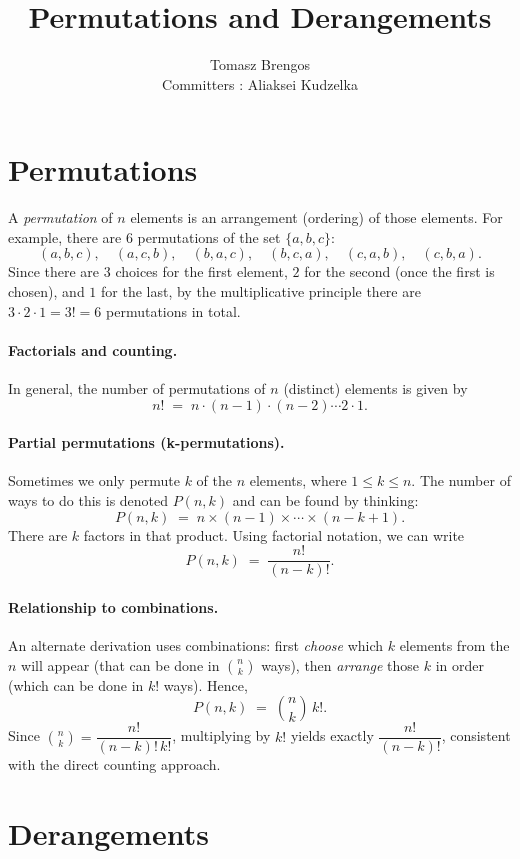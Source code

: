 \documentclass[docmute]{article}
\title{Permutations and Derangements}
\author{Tomasz Brengos \\  
Committers : Aliaksei Kudzelka}
\date{}
\begin{document}
\maketitle

\section{Permutations}
A \emph{permutation} of $n$ elements is an arrangement (ordering) of those elements.
For example, there are $6$ permutations of the set $\{a,b,c\}$:
\[
(a,b,c), \quad (a,c,b), \quad (b,a,c), \quad (b,c,a), \quad (c,a,b), \quad (c,b,a).
\]
Since there are $3$ choices for the first element, $2$ for the second (once the first is chosen), and $1$ for the last, by the multiplicative principle there are $3 \cdot 2 \cdot 1 = 3! = 6$ permutations in total.

\paragraph{Factorials and counting.}
In general, the number of permutations of $n$ (distinct) elements is given by
\[
n! \;=\; n \cdot (n-1) \cdot (n-2) \cdots 2 \cdot 1.
\]


\paragraph{Partial permutations (k-permutations).}
Sometimes we only permute $k$ of the $n$ elements, where $1 \le k \le n$. The number of ways to do this is denoted $P(n,k)$ and can be found by thinking:
\[
P(n,k) \;=\; n \times (n-1) \times \cdots \times (n-k+1).
\]
There are $k$ factors in that product. Using factorial notation, we can write
\[
P(n,k) \;=\; \frac{n!}{(n-k)!}.
\]

\paragraph{Relationship to combinations.}
An alternate derivation uses combinations: first \emph{choose} which $k$ elements from the $n$ will appear (that can be done in $\binom{n}{k}$ ways), then \emph{arrange} those $k$ in order (which can be done in $k!$ ways). Hence,
\[
P(n,k) \;=\; \binom{n}{k} \, k!.
\]
Since $\binom{n}{k} = \dfrac{n!}{(n-k)!\,k!}$, multiplying by $k!$ yields exactly $\dfrac{n!}{(n-k)!}$, consistent with the direct counting approach.

\section{Derangements}
\end{document}
